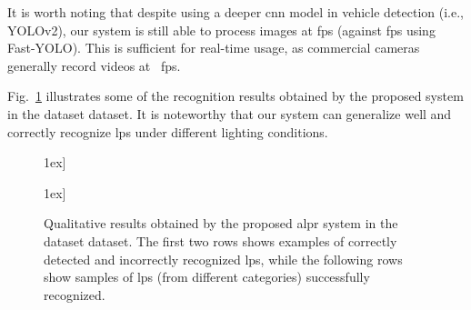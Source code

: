 It is worth noting that despite using a deeper \gls*{cnn} model in vehicle detection (i.e., YOLOv2), our system is still able to process images at  \gls*{fps} (against  \gls*{fps} using Fast-YOLO).  
This is sufficient for real-time usage, as commercial cameras generally record videos at ~\gls*{fps}.

Fig.~\ref{fig:result_dataset} illustrates some of the recognition results obtained by the proposed system in the \acrshort*{dataset} dataset. It is noteworthy that our system can generalize well and correctly recognize \glspl*{lp} under different lighting conditions. 

\begin{figure}[!htb]
	\vspace{-2mm} 
	\centering
	\captionsetup[subfigure]{labelformat=empty} 
	 \-1ex]
		
	 \-1ex]
		

	\caption{Qualitative results obtained by the proposed \gls*{alpr} system in the \gls*{dataset} dataset. The first two rows shows examples of correctly detected and incorrectly recognized \glspl*{lp}, while the following rows show samples of \glspl*{lp} (from different categories) successfully recognized.}
	\label{fig:result_dataset}  
	\vspace{-2mm} 
\end{figure}